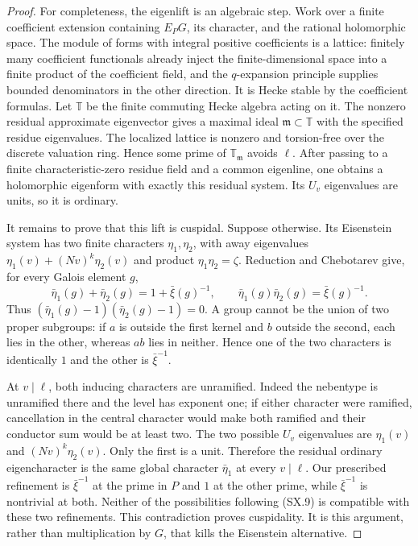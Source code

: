 \begin{proof}
For completeness, the eigenlift is an algebraic step.  Work over a
finite coefficient extension containing $E_PG$, its character, and
the rational holomorphic space.  The module of forms with integral
positive coefficients is a lattice: finitely many coefficient
functionals already inject the finite-dimensional space into a
finite product of the coefficient field, and the $q$-expansion
principle supplies bounded denominators in the other direction.
It is Hecke stable by the coefficient formulas.  Let $\mathbb T$
be the finite commuting Hecke algebra acting on it.  The nonzero
residual approximate eigenvector gives a maximal ideal
$\mathfrak m\subset\mathbb T$ with the specified residue
eigenvalues.  The localized lattice is nonzero and torsion-free
over the discrete valuation ring.  Hence some prime of
$\mathbb T_{\mathfrak m}$ avoids $\ell$.  After passing to a
finite characteristic-zero residue field and a common eigenline,
one obtains a holomorphic eigenform with exactly this residual
system.  Its $U_v$ eigenvalues are units, so it is ordinary.

It remains to prove that this lift is cuspidal.  Suppose otherwise.
Its Eisenstein system has two finite characters $\eta_1,\eta_2$,
with away eigenvalues
$\eta_1(v)+(Nv)^k\eta_2(v)$ and product
$\eta_1\eta_2=\zeta$.  Reduction and Chebotarev give, for every
Galois element $g$,
\[
 \bar\eta_1(g)+\bar\eta_2(g)=1+\bar\xi(g)^{-1},
 \qquad\bar\eta_1(g)\bar\eta_2(g)=\bar\xi(g)^{-1}.
                                                            \tag{SX.9}
\]
Thus $(\bar\eta_1(g)-1)(\bar\eta_2(g)-1)=0$.
A group cannot be the union of two proper subgroups: if $a$ is
outside the first kernel and $b$ outside the second, each lies in
the other, whereas $ab$ lies in neither.  Hence one of the two
characters is identically $1$ and the other is $\bar\xi^{-1}$.

At $v\mid\ell$, both inducing characters are unramified.  Indeed
the nebentype is unramified there and the level has exponent one;
if either character were ramified, cancellation in the central
character would make both ramified and their conductor sum would
be at least two.  The two possible $U_v$ eigenvalues are
$\eta_1(v)$ and $(Nv)^k\eta_2(v)$.  Only the first is a unit.
Therefore the residual ordinary eigencharacter is the same
global character $\bar\eta_1$ at every $v\mid\ell$.
Our prescribed refinement is $\bar\xi^{-1}$ at the prime in $P$
and $1$ at the other prime, while $\bar\xi^{-1}$ is nontrivial at both.
Neither of the possibilities following (SX.9) is compatible with
these two refinements.  This contradiction proves cuspidality.
It is this argument, rather than multiplication by $G$, that kills
the Eisenstein alternative.
\end{proof}

